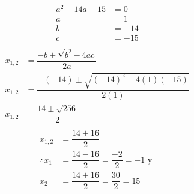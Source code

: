     \begin{solutionbox}{4.5cm}
        \begin{multicols}{3}
            \[
                \begin{array}{rl}
                    a^2-14a-15 & =0   \\
                    a          & =1   \\
                    b          & =-14 \\
                    c          & =-15 \\
                \end{array}
            \]
            \vspace{1cm}
            \[
                \begin{array}{rl}
                    x_{1,2} & = \dfrac{-b\pm\sqrt{b^2-4ac}}{2a}                 \\[1.5em]
                    x_{1,2} & = \dfrac{-(-14)\pm\sqrt{(-14)^2-4(1)(-15)}}{2(1)} \\[1.5em]
                    x_{1,2} & = \dfrac{14\pm\sqrt{256}}{2}                      \\[1.5em]
                \end{array}
            \]
            \[
                \begin{array}{rl}
                    x_{1,2}        & = \dfrac{14\pm 16}{2}                          \\[1.5em]
                    \therefore x_1 & = \dfrac{14-16}{2}=\dfrac{-2}{2}=-1 \text{ y } \\[1.5em]
                    x_2            & = \dfrac{14+16}{2}=\dfrac{30}{2}=15            \\[1.5em]
                \end{array}
            \]
        \end{multicols}
    \end{solutionbox}
